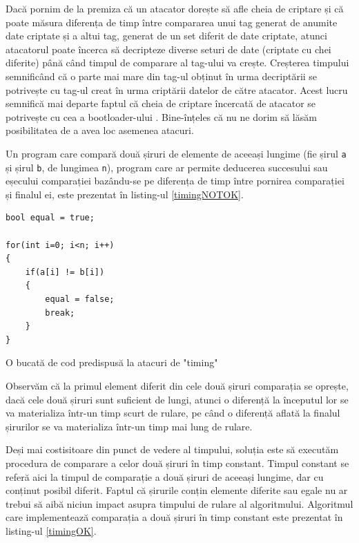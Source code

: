 \documentclass[12pt,a4paper,titlepage]{report}
\begin{document}
Dacă pornim de la premiza că un atacator dorește să afle cheia de criptare și că poate măsura diferența de timp între compararea unui tag generat de anumite date criptate și a altui tag, generat de un set diferit de date criptate, atunci atacatorul poate încerca să decripteze diverse seturi de date (criptate cu chei diferite) până când timpul de comparare al tag-ului va crește. Creșterea timpului semnificând că o parte mai mare din tag-ul obținut în urma decriptării se potrivește cu tag-ul creat în urma criptării datelor de către atacator. Acest lucru semnifică mai departe faptul că cheia de criptare încercată de atacator se potrivește cu cea a bootloader-ului \cite{timingAttack}. Bine-înțeles că nu ne dorim să lăsăm posibilitatea de a avea loc asemenea atacuri.

Un program care compară două șiruri de elemente de aceeași lungime (fie șirul \texttt{a} și șirul \texttt{b}, de lungimea \texttt{n}), program care ar permite deducerea succesului sau eșecului comparației bazându-se pe diferența de timp între pornirea comparației și finalul ei, este prezentat în listing-ul \ref{timingNOTOK}.

\begin{listing}[h]
\begin{verbatim}
bool equal = true;

for(int i=0; i<n; i++)
{
    if(a[i] != b[i])
    {
        equal = false;
        break;
    }
}
\end{verbatim}

\caption{O bucată de cod predispusă la atacuri de "timing"}
\label{timingNOTOK}
\end{listing}

Observăm că la primul element diferit din cele două șiruri comparația se oprește, dacă cele două șiruri sunt suficient de lungi, atunci o diferență la începutul lor se va materializa într-un timp scurt de rulare, pe când o diferență aflată la finalul șirurilor se va materializa într-un timp mai lung de rulare.

Deși mai costisitoare din punct de vedere al timpului, soluția este să executăm procedura de comparare a celor două șiruri în timp constant.
Timpul constant se referă aici la timpul de comparație a două șiruri de aceeași lungime, dar cu conținut posibil diferit. Faptul că șirurile conțin elemente diferite sau egale nu ar trebui să aibă niciun impact asupra timpului de rulare al algoritmului.
Algoritmul care implementează comparația a două șiruri în timp constant este prezentat în listing-ul \ref{timingOK}.
\end{document}
